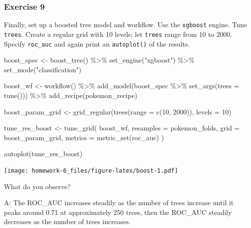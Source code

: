 \documentclass[
]{article}
\newenvironment{Shaded}{\begin{snugshade}}{\end{snugshade}}
\newcommand{\AttributeTok}[1]{\textcolor[rgb]{0.77,0.63,0.00}{#1}}
\newcommand{\DecValTok}[1]{\textcolor[rgb]{0.00,0.00,0.81}{#1}}
\newcommand{\FunctionTok}[1]{\textcolor[rgb]{0.00,0.00,0.00}{#1}}
\newcommand{\NormalTok}[1]{#1}
\newcommand{\OtherTok}[1]{\textcolor[rgb]{0.56,0.35,0.01}{#1}}
\newcommand{\SpecialCharTok}[1]{\textcolor[rgb]{0.00,0.00,0.00}{#1}}
\newcommand{\StringTok}[1]{\textcolor[rgb]{0.31,0.60,0.02}{#1}}
\begin{document}
\hypertarget{exercise-9}{%
\subsubsection{Exercise 9}\label{exercise-9}}

Finally, set up a boosted tree model and workflow. Use the
\texttt{xgboost} engine. Tune \texttt{trees}. Create a regular grid with
10 levels; let \texttt{trees} range from 10 to 2000. Specify
\texttt{roc\_auc} and again print an \texttt{autoplot()} of the results.

\begin{Shaded}
\begin{Highlighting}[]
\NormalTok{boost\_spec }\OtherTok{\textless{}{-}} \FunctionTok{boost\_tree}\NormalTok{() }\SpecialCharTok{\%\textgreater{}\%}
  \FunctionTok{set\_engine}\NormalTok{(}\StringTok{"xgboost"}\NormalTok{) }\SpecialCharTok{\%\textgreater{}\%}
  \FunctionTok{set\_mode}\NormalTok{(}\StringTok{"classification"}\NormalTok{)}

\NormalTok{boost\_wf }\OtherTok{\textless{}{-}} \FunctionTok{workflow}\NormalTok{() }\SpecialCharTok{\%\textgreater{}\%}
  \FunctionTok{add\_model}\NormalTok{(boost\_spec }\SpecialCharTok{\%\textgreater{}\%} \FunctionTok{set\_args}\NormalTok{(}\AttributeTok{trees =} \FunctionTok{tune}\NormalTok{())) }\SpecialCharTok{\%\textgreater{}\%}
  \FunctionTok{add\_recipe}\NormalTok{(pokemon\_recipe)}

\NormalTok{boost\_param\_grid }\OtherTok{\textless{}{-}} \FunctionTok{grid\_regular}\NormalTok{(}\FunctionTok{trees}\NormalTok{(}\AttributeTok{range =} \FunctionTok{c}\NormalTok{(}\DecValTok{10}\NormalTok{, }\DecValTok{2000}\NormalTok{)), }\AttributeTok{levels =} \DecValTok{10}\NormalTok{)}

\NormalTok{tune\_res\_boost }\OtherTok{\textless{}{-}} \FunctionTok{tune\_grid}\NormalTok{(}
\NormalTok{  boost\_wf, }
  \AttributeTok{resamples =}\NormalTok{ pokemon\_folds, }
  \AttributeTok{grid =}\NormalTok{ boost\_param\_grid, }
  \AttributeTok{metrics =} \FunctionTok{metric\_set}\NormalTok{(roc\_auc)}
\NormalTok{)}

\FunctionTok{autoplot}\NormalTok{(tune\_res\_boost)}
\end{Highlighting}
\end{Shaded}

\texttt{[image: homework-6\_files/figure-latex/boost-1.pdf]}

What do you observe?

A: The ROC\_AUC increases steadily as the number of trees increase until
it peaks around 0.71 at approximately 250 trees, then the ROC\_AUC
steadily decreases as the number of trees increases.
\end{document}
